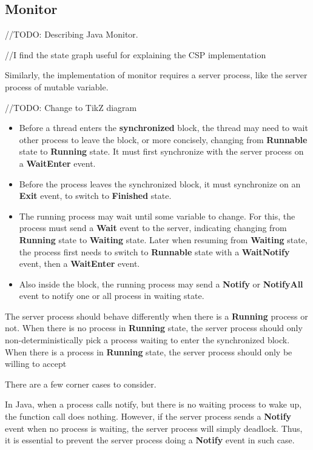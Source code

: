 \documentclass{article}
\begin{document}
\subsection{Monitor}

//TODO: Describing Java Monitor.

//I find the state graph useful for explaining the CSP implementation

Similarly, the implementation of monitor requires a server process, like the server process of mutable variable.

//TODO: Change to TikZ diagram
\begin{itemize}
    \item Before a thread enters the \textbf{synchronized} block, the thread may need to wait other process to leave the block, or more concisely, changing from \textbf{Runnable} state to \textbf{Running} state. It must first synchronize with the server process on a \textbf{WaitEnter} event.
    \item Before the process leaves the synchronized block, it must synchronize on an \textbf{Exit} event, to switch to \textbf{Finished} state.
    \item The running process may wait until some variable to change. For this, the process must send a \textbf{Wait} event to the server, indicating changing from \textbf{Running} state to \textbf{Waiting} state. Later when resuming from \textbf{Waiting} state, the process first needs to switch to \textbf{Runnable} state with a \textbf{WaitNotify} event, then a \textbf{WaitEnter} event.
    \item Also inside the block, the running process may send a \textbf{Notify} or \textbf{NotifyAll} event to notify one or all process in waiting state.
\end{itemize}

The server process should behave differently when there is a \textbf{Running} process or not. When there is no process in \textbf{Running} state, the server process should only non-deterministically pick a process waiting to enter the synchronized block. When there is a process in \textbf{Running} state, the server process should only be willing to accept 

There are a few corner cases to consider.

In Java, when a process calls notify, but there is no waiting process to wake up, the function call does nothing. However, if the server process sends a \textbf{Notify} event when no process is waiting, the server process will simply deadlock. Thus, it is essential to prevent the server process doing a \textbf{Notify} event in such case.
\end{document}
